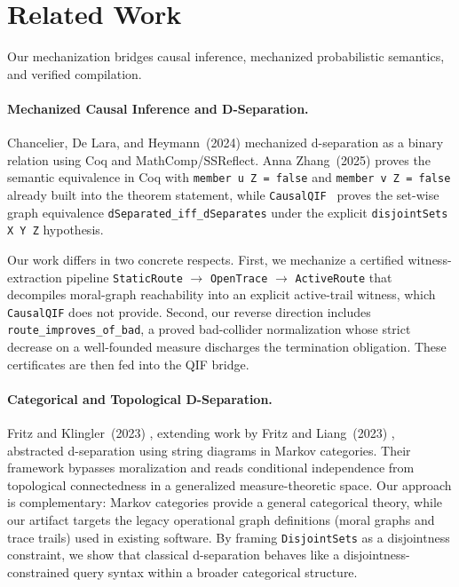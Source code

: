 \documentclass[acmsmall,screen,review,anonymous,nonacm]{acmart}
\newcommand{\lean}[1]{\lstinline!#1!}
\begin{document}
\section{Related Work}
\label{sec:related}

Our mechanization bridges causal inference, mechanized probabilistic semantics, and verified compilation.

\paragraph{Mechanized Causal Inference and D-Separation.}
Chancelier, De Lara, and Heymann~(2024) \cite{chancelier2024conditional} mechanized d-separation as a binary relation using Coq and MathComp/SSReflect. Anna Zhang~(2025) \cite{coqci2025} proves the semantic equivalence in Coq with \lean{member u Z = false} and \lean{member v Z = false} already built into the theorem statement, while \lean{CausalQIF}~\cite{causalqif2026} proves the set-wise graph equivalence \lean{dSeparated_iff_dSeparates} under the explicit \lean{disjointSets X Y Z} hypothesis.

Our work differs in two concrete respects.  First, we mechanize a certified witness-extraction pipeline \lean{StaticRoute} $\to$ \lean{OpenTrace} $\to$ \lean{ActiveRoute} that decompiles moral-graph reachability into an explicit active-trail witness, which \lean{CausalQIF} does not provide.  Second, our reverse direction includes \lean{route_improves_of_bad}, a proved bad-collider normalization whose strict decrease on a well-founded measure discharges the termination obligation.  These certificates are then fed into the QIF bridge.

\paragraph{Categorical and Topological D-Separation.}
Fritz and Klingler~(2023) \cite{fritz2023dseparation}, extending work by Fritz and Liang~(2023) \cite{fritz2023free}, abstracted d-separation using string diagrams in Markov categories. Their framework bypasses moralization and reads conditional independence from topological connectedness in a generalized measure-theoretic space. Our approach is complementary: Markov categories provide a general categorical theory, while our artifact targets the legacy operational graph definitions (moral graphs and trace trails) used in existing software. By framing \lean{DisjointSets} as a disjointness constraint, we show that classical d-separation behaves like a disjointness-constrained query syntax within a broader categorical structure.
\end{document}
